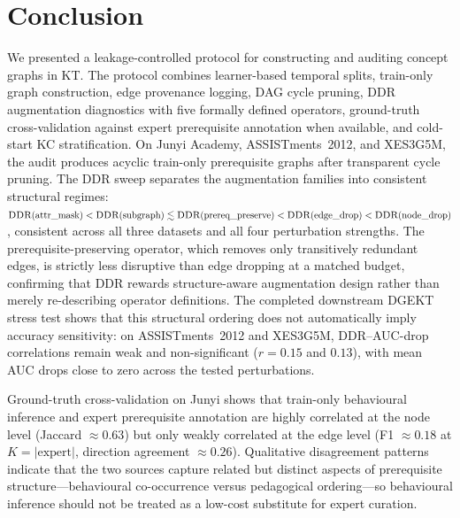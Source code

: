 \documentclass[pdflatex,sn-basic]{sn-jnl}
\newcommand{\DDR}{\textsc{DDR}}
\begin{document}
\section{Conclusion}
\label{sec:concl}
We presented a leakage-controlled protocol for constructing and auditing
concept graphs in KT. The protocol combines learner-based temporal
splits, train-only graph construction, edge provenance logging, DAG
cycle pruning, \DDR{} augmentation diagnostics with five formally
defined operators, ground-truth cross-validation against expert
prerequisite annotation when available, and cold-start KC
stratification. On Junyi Academy, ASSISTments~2012, and XES3G5M, the
audit produces acyclic train-only prerequisite graphs after transparent
cycle pruning. The \DDR{} sweep separates the augmentation
families into consistent structural regimes:
$\DDR(\text{attr\_mask}) < \DDR(\text{subgraph}) \lesssim
\DDR(\text{prereq\_preserve}) < \DDR(\text{edge\_drop}) <
\DDR(\text{node\_drop})$,
consistent across all three datasets and all four perturbation
strengths. The prerequisite-preserving operator, which removes only
transitively redundant edges, is strictly less disruptive than edge
dropping at a matched budget, confirming that \DDR{} rewards
structure-aware augmentation design rather than merely re-describing
operator definitions. The completed downstream DGEKT stress test shows
that this structural ordering does not automatically imply accuracy
sensitivity: on ASSISTments~2012 and XES3G5M, \DDR{}--AUC-drop
correlations remain weak and non-significant ($r{=}0.15$ and $0.13$),
with mean AUC drops close to zero across the tested perturbations.

Ground-truth cross-validation on Junyi shows that train-only
behavioural inference and expert prerequisite annotation are highly
correlated at the node level (Jaccard $\approx 0.63$) but only weakly
correlated at the edge level (F1 $\approx 0.18$ at $K=|\text{expert}|$,
direction agreement $\approx 0.26$). Qualitative disagreement patterns
indicate that the two sources capture related but distinct aspects of
prerequisite structure---behavioural co-occurrence versus pedagogical
ordering---so behavioural inference should not be treated as a
low-cost substitute for expert curation.
\end{document}
